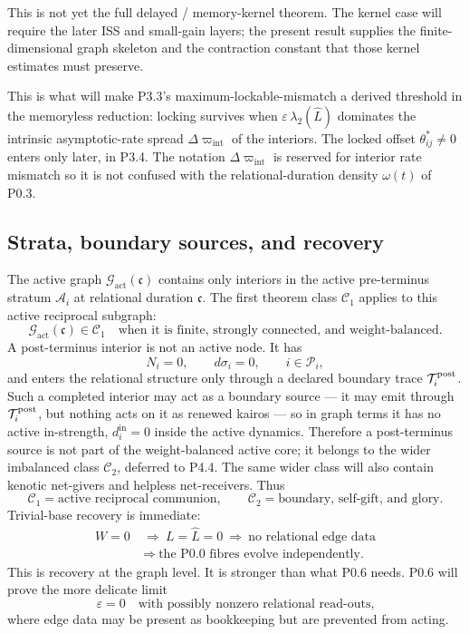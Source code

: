 \documentclass[11pt,a4paper]{article}
\theoremstyle{definition}
\theoremstyle{plain}
\theoremstyle{remark}
\begin{document}
This is not yet the full delayed / memory-kernel theorem. The kernel case will
require the later ISS and small-gain layers; the present result supplies the
finite-dimensional graph skeleton and the contraction constant that those kernel
estimates must preserve.

This is what will make P3.3's maximum-lockable-mismatch a derived threshold in the
memoryless reduction: locking survives when $\varepsilon\,\lambda_2(\hat L)$
dominates the intrinsic asymptotic-rate spread $\Delta\varpi_{\mathrm{int}}$ of the
interiors. The locked offset $\theta^*_{ij}\neq0$ enters only later, in P3.4. The
notation $\Delta\varpi_{\mathrm{int}}$ is reserved for interior rate mismatch so it
is not confused with the relational-duration density $\omega(t)$ of P0.3.

\subsection{Strata, boundary sources, and recovery}

The active graph $\mathcal G_{\mathrm{act}}(\mathfrak c)$ contains only interiors in
the active pre-terminus stratum $\mathcal A_i$ at relational duration $\mathfrak c$.
The first theorem class $\mathcal C_1$ applies to this active reciprocal subgraph:
\[
\mathcal G_{\mathrm{act}}(\mathfrak c)\in\mathcal C_1
\quad\text{when it is finite, strongly connected, and weight-balanced.}
\]
A post-terminus interior is not an active node. It has
\[
N_i=0,\qquad d\sigma_i=0,\qquad i\in\mathcal P_i,
\]
and enters the relational structure only through a declared boundary trace
$\mathcal T_i^{\rm post}$. Such a completed interior may act as a boundary source ---
it may emit through $\mathcal T_i^{\rm post}$, but nothing acts on it as renewed
kairos --- so in graph terms it has no active in-strength, $d_i^{\mathrm{in}}=0$
inside the active dynamics. Therefore a post-terminus source is not part of the
weight-balanced active core; it belongs to the wider imbalanced class $\mathcal C_2$,
deferred to P4.4. The same wider class will also contain kenotic net-givers and
helpless net-receivers. Thus
\[
\mathcal C_1=\text{active reciprocal communion},\qquad
\mathcal C_2=\text{boundary, self-gift, and glory}.
\]
Trivial-base recovery is immediate:
\[
\begin{aligned}
W=0\ &\Longrightarrow\ L=\hat L=0\ \Longrightarrow\ \text{no relational edge data}\\
&\Longrightarrow\ \text{the P0.0 fibres evolve independently.}
\end{aligned}
\]
This is recovery at the graph level. It is stronger than what P0.6 needs. P0.6
will prove the more delicate limit
\[
\varepsilon=0
\quad\text{with possibly nonzero relational read-outs,}
\]
where edge data may be present as bookkeeping but are prevented from acting.
\end{document}
